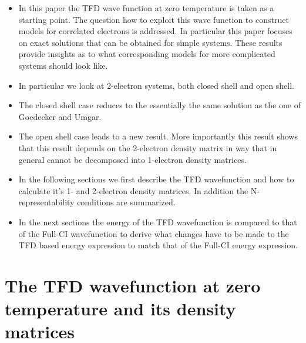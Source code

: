 \documentclass[aip,graphicx]{revtex4-1}
\begin{document}
\begin{itemize}
    \item In this paper the TFD wave function at zero temperature is taken as a starting point. The question how to exploit this wave function to construct models for correlated electrons is addressed. In particular this paper focuses on exact solutions that can be obtained for simple systems. These results provide insights as to what corresponding models for more complicated systems should look like.
    \item In particular we look at 2-electron systems, both closed shell and open shell.
    \item The closed shell case reduces to the essentially the same solution as the one of Goedecker and Umgar\cite{Goedecker_2000}.
    \item The open shell case leads to a new result. More importantly this result shows that this result depends on the 2-electron density matrix in way that in general cannot be decomposed into 1-electron density matrices.
    \item In the following sections we first describe the TFD wavefunction and how to calculate it's 1- and 2-electron density matrices. In addition the N-representability conditions are summarized. 
    \item In the next sections the energy of the TFD wavefunction is compared to that of the Full-CI wavefunction to derive what changes have to be made to the TFD based energy expression to match that of the Full-CI energy expression.  
\end{itemize}

\section{The TFD wavefunction at zero temperature and its density matrices}
\label{tfdsummary}
\end{document}
